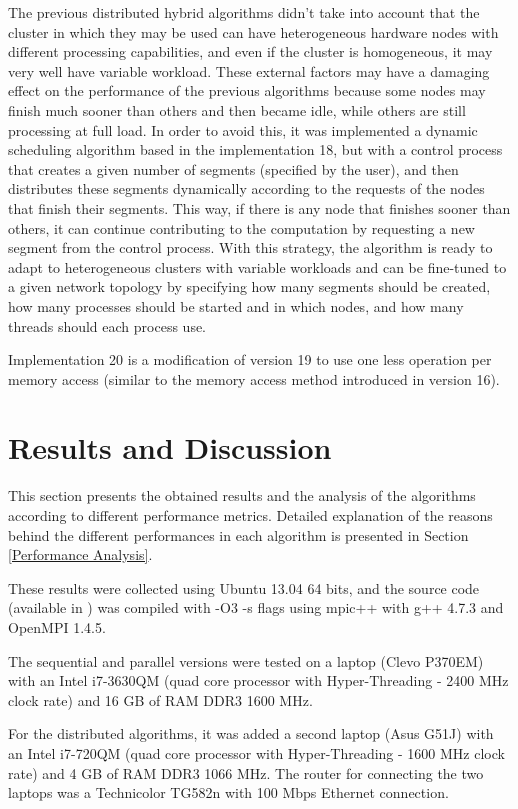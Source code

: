 \documentclass[runningheads,a4paper]{llncs}
\begin{document}
The previous distributed hybrid algorithms didn't take into account that the cluster in which they may be used can have heterogeneous hardware nodes with different processing capabilities, and even if the cluster is homogeneous, it may very well have variable workload. These external factors may have a damaging effect on the performance of the previous algorithms because some nodes may finish much sooner than others and then became idle, while others are still processing at full load. In order to avoid this, it was implemented a dynamic scheduling algorithm based in the implementation 18, but with a control process that creates a given number of segments (specified by the user), and then distributes these segments dynamically according to the requests of the nodes that finish their segments. This way, if there is any node that finishes sooner than others, it can continue contributing to the computation by requesting a new segment from the control process. With this strategy, the algorithm is ready to adapt to heterogeneous clusters with variable workloads and can be fine-tuned to a given network topology by specifying how many segments should be created, how many processes should be started and in which nodes, and how many threads should each process use.

Implementation 20 is a modification of version 19 to use one less operation per memory access (similar to the memory access method introduced in version 16).


\section{Results and Discussion}
\label{Results and Discussion}

This section presents the obtained results and the analysis of the algorithms according to different performance metrics. Detailed explanation of the reasons behind the different performances in each algorithm is presented in Section \ref{Performance Analysis}.

These results were collected using Ubuntu 13.04 64 bits, and the source code (available in \cite{costa2013}) was compiled with -O3 -s flags using mpic++ with g++ 4.7.3 and OpenMPI 1.4.5.

The sequential and parallel versions were tested on a laptop (Clevo P370EM) with an Intel i7-3630QM (quad core processor with Hyper-Threading - 2400 MHz clock rate) and 16 GB of RAM DDR3 1600 MHz.

For the distributed algorithms, it was added a second laptop (Asus G51J) with an Intel i7-720QM (quad core processor with Hyper-Threading - 1600 MHz clock rate) and 4 GB of RAM DDR3 1066 MHz. The router for connecting the two laptops was a Technicolor TG582n with 100 Mbps Ethernet connection.
\end{document}
